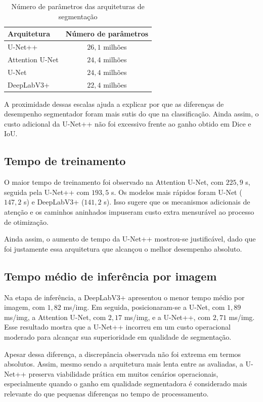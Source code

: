\documentclass[tcc,capa]{texufpel}
\begin{document}
\begin{table}[htbp]
	\centering
	\caption{Número de parâmetros das arquiteturas de segmentação}
	\label{tab:parametros_segmentacao}
	\begin{tabular}{|l|c|}
		\hline
		\textbf{Arquitetura} & \textbf{Número de parâmetros} \\ \hline
		U-Net++ & \(26{,}1\) milhões \\ \hline
		Attention U-Net & \(24{,}4\) milhões \\ \hline
		U-Net & \(24{,}4\) milhões \\ \hline
		DeepLabV3+ & \(22{,}4\) milhões \\ \hline
	\end{tabular}
\end{table}

A proximidade dessas escalas ajuda a explicar por que as diferenças de desempenho segmentador foram mais sutis do que na classificação. Ainda assim, o custo adicional da U-Net++ não foi excessivo frente ao ganho obtido em Dice e IoU.

\subsection{Tempo de treinamento}

O maior tempo de treinamento foi observado na Attention U-Net, com \(225{,}9\) s, seguida pela U-Net++ com \(193{,}5\) s. Os modelos mais rápidos foram U-Net (\(147{,}2\) s) e DeepLabV3+ (\(141{,}2\) s). Isso sugere que os mecanismos adicionais de atenção e os caminhos aninhados impuseram custo extra mensurável ao processo de otimização.

Ainda assim, o aumento de tempo da U-Net++ mostrou-se justificável, dado que foi justamente essa arquitetura que alcançou o melhor desempenho absoluto.

\subsection{Tempo médio de inferência por imagem}

Na etapa de inferência, a DeepLabV3+ apresentou o menor tempo médio por imagem, com \(1{,}82\) ms/img. Em seguida, posicionaram-se a U-Net, com \(1{,}89\) ms/img, a Attention U-Net, com \(2{,}17\) ms/img, e a U-Net++, com \(2{,}71\) ms/img. Esse resultado mostra que a U-Net++ incorreu em um custo operacional moderado para alcançar sua superioridade em qualidade de segmentação.

Apesar dessa diferença, a discrepância observada não foi extrema em termos absolutos. Assim, mesmo sendo a arquitetura mais lenta entre as avaliadas, a U-Net++ preserva viabilidade prática em muitos cenários operacionais, especialmente quando o ganho em qualidade segmentadora é considerado mais relevante do que pequenas diferenças no tempo de processamento.
\end{document}
